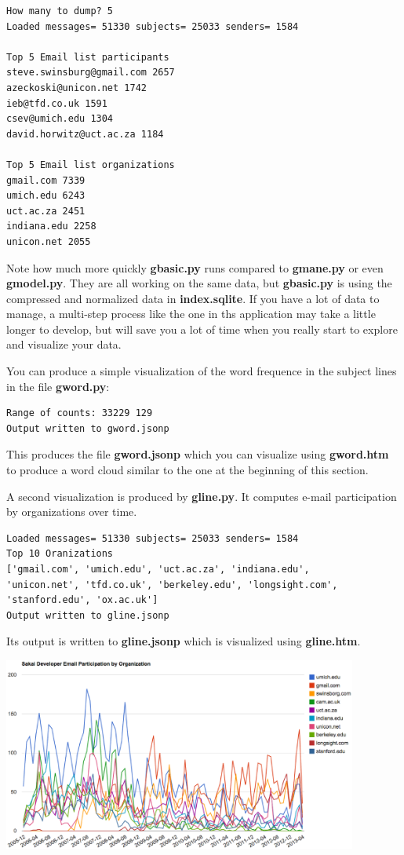 \documentclass[11pt]{book}
\begin{document}
\beforeverb
\begin{verbatim}
How many to dump? 5
Loaded messages= 51330 subjects= 25033 senders= 1584

Top 5 Email list participants
steve.swinsburg@gmail.com 2657
azeckoski@unicon.net 1742
ieb@tfd.co.uk 1591
csev@umich.edu 1304
david.horwitz@uct.ac.za 1184

Top 5 Email list organizations
gmail.com 7339
umich.edu 6243
uct.ac.za 2451
indiana.edu 2258
unicon.net 2055
\end{verbatim}
\afterverb
%
Note how much more quickly {\bf gbasic.py} runs compared to {\bf gmane.py}
or even {\bf gmodel.py}. They are all working on the same data, but 
{\bf gbasic.py} is using the compressed and normalized data in 
{\bf index.sqlite}.  If you have a lot of data to manage, a multi-step
process like the one in ths application may take a little longer to develop,
but will save you a lot of time when you really start to explore
and visualize your data.

You can produce a simple visualization of the word frequence in the subject lines
in the file {\bf gword.py}:

\beforeverb
\begin{verbatim}
Range of counts: 33229 129
Output written to gword.jsonp
\end{verbatim}
\afterverb
%

This produces the file {\bf gword.jsonp} which you can visualize using
{\bf gword.htm} to produce a word cloud similar to the one at the beginning 
of this section.

A second visualization is produced  by {\bf gline.py}.  It computes e-mail 
participation by organizations over time.

\beforeverb
\begin{verbatim}
Loaded messages= 51330 subjects= 25033 senders= 1584
Top 10 Oranizations
['gmail.com', 'umich.edu', 'uct.ac.za', 'indiana.edu', 
'unicon.net', 'tfd.co.uk', 'berkeley.edu', 'longsight.com', 
'stanford.edu', 'ox.ac.uk']
Output written to gline.jsonp
\end{verbatim}
\afterverb
%
Its output is written to {\bf gline.jsonp} which is visualized using {\bf gline.htm}.

\beforefig
\centerline{\includegraphics[height=2.50in]{figs2/mailorg.eps}}
\afterfig
\end{document}
